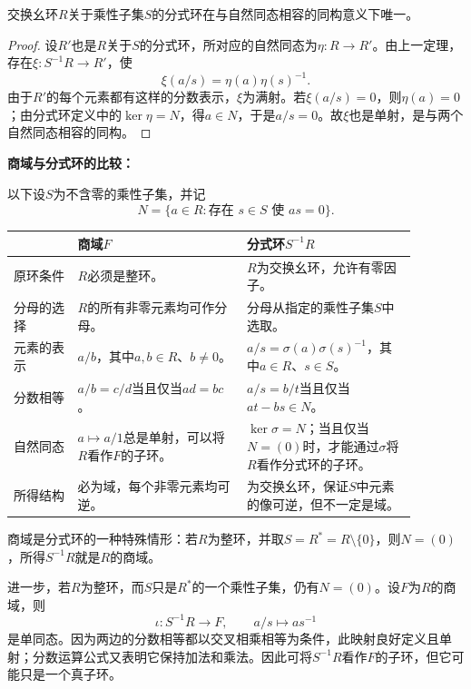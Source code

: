 \begin{corollary}
交换幺环$R$关于乘性子集$S$的分式环在与自然同态相容的同构意义下唯一。
\end{corollary}
\begin{proof}
设$R'$也是$R$关于$S$的分式环，所对应的自然同态为$\eta:R\to R'$。由上一定理，存在$\xi:S^{-1}R\to R'$，使
\[
\xi(a/s)=\eta(a)\eta(s)^{-1}.
\]
由于$R'$的每个元素都有这样的分数表示，$\xi$为满射。若$\xi(a/s)=0$，则$\eta(a)=0$；由分式环定义中的$\ker\eta=N$，得$a\in N$，于是$a/s=0$。故$\xi$也是单射，是与两个自然同态相容的同构。
\end{proof}



\medskip
\noindent\textbf{商域与分式环的比较：}

以下设$S$为不含零的乘性子集，并记
\[
N=\{a\in R:\text{存在 }s\in S\text{ 使 }as=0\}.
\]
\begin{center}
\begingroup
\small
\setlength{\tabcolsep}{4pt}
\renewcommand{\arraystretch}{1.35}
\begin{tabular}{|p{0.14\linewidth}|p{0.37\linewidth}|p{0.37\linewidth}|}
\hline
& 商域$F$ & 分式环$S^{-1}R$\\
\hline
原环条件 & $R$必须是整环。 & $R$为交换幺环，允许有零因子。\\
\hline
分母的选择 & $R$的所有非零元素均可作分母。 & 分母从指定的乘性子集$S$中选取。\\
\hline
元素的表示 & $a/b$，其中$a,b\in R$、$b\ne0$。 & $a/s=\sigma(a)\sigma(s)^{-1}$，其中$a\in R$、$s\in S$。\\
\hline
分数相等 & $a/b=c/d$当且仅当$ad=bc$。 & $a/s=b/t$当且仅当$at-bs\in N$。\\
\hline
自然同态 & $a\mapsto a/1$总是单射，可以将$R$看作$F$的子环。 & $\ker\sigma=N$；当且仅当$N=(0)$时，才能通过$\sigma$将$R$看作分式环的子环。\\
\hline
所得结构 & 必为域，每个非零元素均可逆。 & 为交换幺环，保证$S$中元素的像可逆，但不一定是域。\\
\hline
\end{tabular}
\endgroup
\end{center}

商域是分式环的一种特殊情形：若$R$为整环，并取$S=R^*=R\setminus\{0\}$，则$N=(0)$，所得$S^{-1}R$就是$R$的商域。

进一步，若$R$为整环，而$S$只是$R^*$的一个乘性子集，仍有$N=(0)$。设$F$为$R$的商域，则
\[
\iota:S^{-1}R\longrightarrow F,\qquad a/s\longmapsto as^{-1}
\]
是单同态。因为两边的分数相等都以交叉相乘相等为条件，此映射良好定义且单射；分数运算公式又表明它保持加法和乘法。因此可将$S^{-1}R$看作$F$的子环，但它可能只是一个真子环。


